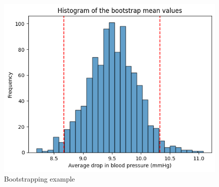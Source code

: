 \begin{figure}[h]
    \centering
    \includegraphics[width=\textwidth]{pictures/PlotBootstrappingExample.png}
    \caption{Bootstrapping example}
    \label{fig:meinbild}
\end{figure}
